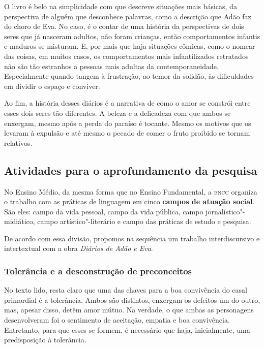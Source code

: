 \documentclass[12pt]{extarticle}
\begin{document}
O livro é belo na simplicidade com que descreve situações mais básicas,
da perspectiva de alguém que desconhece palavras, como a descrição que
Adão faz do choro de Eva. No caso, é o contar de uma história da
perspectivas de dois seres que já nasceram adultos, não foram crianças,
então comportamentos infantis e maduros se misturam. E, por mais que
haja situações cômicas, como o nomear das coisas, em muitos casos, os
comportamentos mais infantilizados retratados não são tão estranhos a
pessoas mais adultas da contemporaneidade. Especialmente quando tangem à
frustração, ao temor da solidão, às dificuldades em dividir o espaço e
conviver.

Ao fim, a história desses diários é a narrativa de como o amor se
constrói entre esses dois seres tão diferentes. A beleza e a delicadeza
com que ambos se enxergam, mesmo após a perda do paraíso é tocante.
Mesmo os motivos que os levaram à expulsão e até mesmo o pecado de comer
o fruto proibido se tornam relativos.


\subsection{Atividades para o aprofundamento da pesquisa}

No Ensino Médio, da mesma forma que no Ensino Fundamental, a \textsc{bncc}
organiza o trabalho com as práticas de linguagem em cinco \textbf{campos
de atuação social}. São eles: campo da vida pessoal, campo da vida
pública, campo jornalístico"-midiático, campo artístico"-literário e campo
das práticas de estudo e pesquisa.

De acordo com essa divisão, propomos na sequência um trabalho
interdiscursivo e intertextual com a obra \emph{Diários de Adão e Eva}.

\subsubsection{Tolerância e a desconstrução de preconceitos}

No texto lido, resta claro que uma das chaves para a boa convivência
do casal primordial é a tolerância. Ambos são distintos, enxergam os
defeitos um do outro, mas, apesar disso, detêm amor mútuo. Na verdade,
o que ambas as personagens desenvolveram foi o sentimento de
aceitação, empatia e boa convivência. Entretanto, para que esses se
formem, é necessário que haja, inicialmente, uma predisposição à
tolerância.
\end{document}
